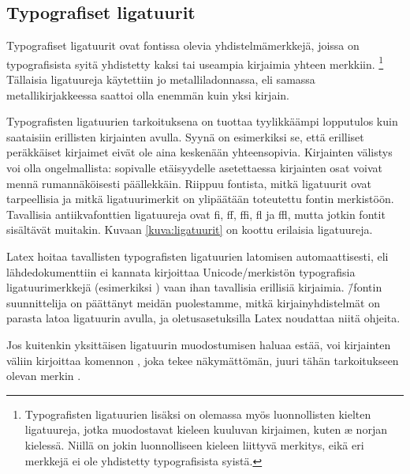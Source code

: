 \subsection{Typografiset ligatuurit}

Typografiset ligatuurit ovat fontissa olevia yhdistelmämerkkejä, joissa
on typografisista syitä yhdistetty kaksi tai useampia kirjaimia yhteen
merkkiin.%
\footnote{Typografisten ligatuurien lisäksi on olemassa myös
  luonnollisten kielten ligatuureja, jotka muodostavat kieleen kuuluvan
  kirjaimen, kuten æ norjan kielessä. Niillä on jokin luonnolliseen
  kieleen liittyvä merkitys, eikä eri merkkejä ei ole yhdistetty
  typografisista syistä.} Tällaisia ligatuureja käytettiin jo
metalliladonnassa, eli samassa metallikirjakkeessa saattoi olla enemmän
kuin yksi kirjain.

Typografisten ligatuurien tarkoituksena on tuottaa tyylikkäämpi
lopputulos kuin saataisiin erillisten kirjainten avulla. Syynä on
esimerkiksi se, että erilliset peräkkäiset kirjaimet eivät ole aina
keskenään yhteensopivia. Kirjainten välistys voi olla ongelmallista:
sopivalle etäisyydelle asetettaessa kirjainten osat voivat mennä
rumannäköisesti päällekkäin. Riippuu fontista, mitkä ligatuurit ovat
tarpeellisia ja mitkä ligatuurimerkit on ylipäätään toteutettu fontin
merkistöön. Tavallisia antiikvafonttien ligatuureja ovat fi, ff, ffi, fl
ja ffl, mutta jotkin fontit sisältävät muitakin. Kuvaan
\ref{kuva:ligatuurit} on koottu erilaisia ligatuureja.


Latex hoitaa tavallisten typografisten ligatuurien latomisen
automaattisesti, eli lähdedokumenttiin ei kannata kirjoittaa
Unicode\-/merkistön typografisia ligatuurimerkkejä (esimerkiksi
) vaan ihan tavallisia
erillisiä kirjaimia.  \=/fontin suunnittelija on
päättänyt meidän puolestamme, mitkä kir\-jain\-yh\-dis\-tel\-mät on
parasta latoa ligatuurin avulla, ja ole\-tus\-ase\-tuk\-sil\-la Latex
noudattaa niitä ohjeita.

Jos kuitenkin yksittäisen ligatuurin muodostumisen haluaa estää, voi
kirjainten väliin kirjoittaa komennon , joka tekee näkymättömän, juuri tähän
tarkoitukseen olevan merkin .

